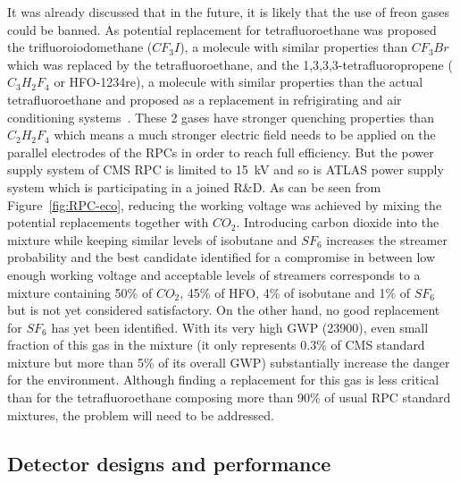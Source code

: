 	It was already discussed that in the future, it is likely that the use of freon gases could be banned. As potential replacement for tetrafluoroethane was proposed the trifluoroiodomethane ($CF_3I$), a molecule with similar properties than $CF_3Br$ which was replaced by the tetrafluoroethane, and the 1,3,3,3-tetrafluoropropene ($C_3H_2F_4$ or HFO-1234re), a molecule with similar properties than the actual tetrafluoroethane and proposed as a replacement in refrigirating and air conditioning systems~\cite{HFO2015}. These 2 gases have stronger quenching properties than $C_2H_2F_4$ which means a much stronger electric field needs to be applied on the parallel electrodes of the RPCs in order to reach full efficiency. But the power supply system of CMS RPC is limited to \SI{15}{kV} and so is ATLAS power supply system which is participating in a joined R\&D. As can be seen from Figure~\ref{fig:RPC-eco}, reducing the working voltage was achieved by mixing the potential replacements together with $CO_2$. Introducing carbon dioxide into the mixture while keeping similar levels of isobutane and $SF_6$ increases the streamer probability and the best candidate identified for a compromise in between low enough working voltage and acceptable levels of streamers corresponds to a mixture containing 50\% of $CO_2$, 45\% of HFO, 4\% of isobutane and 1\% of $SF_6$ but is not yet considered satisfactory. On the other hand, no good replacement for $SF_6$ has yet been identified. With its very high \acl{GWP} (23900), even small fraction of this gas in the mixture (it only represents 0.3\% of CMS standard mixture but more than 5\% of its overall GWP) substantially increase the danger for the environment. Although finding a replacement for this gas is less critical than for the tetrafluoroethane composing more than 90\% of usual RPC standard mixtures, the problem will need to be addressed.
	
	\subsection{Detector designs and performance}
	\label{chapt4:ssec:design}
	
